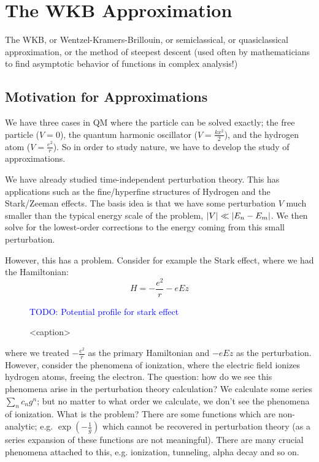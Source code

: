 \section{The WKB Approximation}
The WKB, or Wentzel-Kramers-Brillouin, or semiclassical, or quasiclassical approximation, or the method of steepest descent (used often by mathematicians to find asymptotic behavior of functions in complex analysis!)

\subsection{Motivation for Approximations}
We have three cases in QM where the particle can be solved exactly; the free particle ($V = 0$), the quantum harmonic oscillator ($V = \frac{kx^2}{2}$), and the hydrogen atom ($V = \frac{e^2}{r}$). So in order to study nature, we have to develop the study of approximations. 

We have already studied time-independent perturbation theory. This has applications such as the fine/hyperfine structures of Hydrogen and the Stark/Zeeman effects. The basis idea is that we have some perturbation $V$ much smaller than the typical energy scale of the problem, $\lvert V \rvert \ll \lvert E_n - E_m \rvert$. We then solve for the lowest-order corrections to the energy coming from this small perturbation.

However, this has a problem. Consider for example the Stark effect, where we had the Hamiltonian:
\begin{equation}
    H = -\frac{e^2}{r} - eEz
\end{equation}

\begin{figure}[htbp]
    \centering
    \textcolor{blue}{TODO: Potential profile for stark effect}
    \caption{<caption>}
    \label{<label>}
\end{figure}
where we treated $-\frac{e^2}{r}$ as the primary Hamiltonian and $-eEz$ as the perturbation. However, consider the phenomena of ionization, where the electric field ionizes hydrogen atoms, freeing the electron. The question: how do we see this phenomena arise in the perturbation theory calculation? We calculate some series $\sum_n c_n g^n$; but no matter to what order we calculate, we don't see the phenomena of ionization. What is the problem? There are some functions which are non-analytic; e.g. $\exp(-\frac{1}{g})$ which cannot be recovered in perturbation theory (as a series expansion of these functions are not meaningful). There are many crucial phenomena attached to this, e.g. ionization, tunneling, alpha decay and so on.

